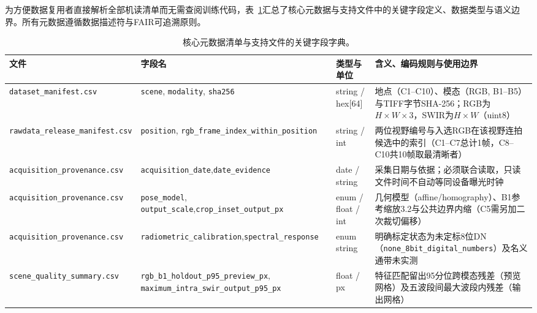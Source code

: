\documentclass[UTF8,a4paper,10pt]{ctexart}
\begin{document}
为方便数据复用者直接解析全部机读清单而无需查阅训练代码，表~\ref{tab:data-dict-zh}汇总了核心元数据与支持文件中的关键字段定义、数据类型与语义边界。所有元数据遵循数据描述符与FAIR可追溯原则\cite{sansone2019,starr2015,wilkinson2016}。

\begin{table}[htbp]
\centering
\caption{核心元数据清单与支持文件的关键字段字典。}
\label{tab:data-dict-zh}
\footnotesize\setlength{\tabcolsep}{4pt}
\begin{tabularx}{\textwidth}{@{}>{\raggedright\arraybackslash}p{}>{\raggedright\arraybackslash}p{}>{\raggedright\arraybackslash}p{}>{\raggedright\arraybackslash}X@{}}
\toprule
文件 & 字段名 & 类型与单位 & 含义、编码规则与使用边界\\
\midrule
\texttt{dataset\_manifest.csv} & \texttt{scene}, \texttt{modality}, \texttt{sha256} & string / hex[64] & 地点（C1--C10）、模态（RGB, B1--B5）与TIFF字节SHA-256；RGB为$H\times W\times 3$，SWIR为$H\times W$（uint8）\\
\texttt{rawdata\_release\_\newline manifest.csv} & \texttt{position}, \texttt{rgb\_frame\_\newline index\_within\_position} & string / int & 两位视野编号与入选RGB在该视野连拍候选中的索引（C1--C7总计1帧，C8--C10共10帧取最清晰者）\\
\texttt{acquisition\_\newline provenance.csv} & \texttt{acquisition\_date},\newline \texttt{date\_evidence} & date / string & 采集日期与依据；必须联合读取，只读文件时间不自动等同设备曝光时钟\\
\texttt{acquisition\_\newline provenance.csv} & \texttt{pose\_model}, \texttt{output\_scale},\newline \texttt{crop\_inset\_output\_px} & enum / float / int & 几何模型（affine/homography）、B1参考缩放3.2与公共边界内缩（C5需另加二次裁切偏移）\\
\texttt{acquisition\_\newline provenance.csv} & \texttt{radiometric\_calibration},\newline \texttt{spectral\_response} & enum string & 明确标定状态为未定标8位DN（\texttt{none\_8bit\_digital\_numbers}）及名义通带未实测\\
\texttt{scene\_quality\_\newline summary.csv} & \texttt{rgb\_b1\_holdout\_p95\_\newline preview\_px}, \texttt{maximum\_intra\_\newline swir\_output\_p95\_px} & float / px & 特征匹配留出95分位跨模态残差（预览网格）及五波段间最大波段内残差（输出网格）\\

\end{tabularx}
\end{table}
\end{document}
